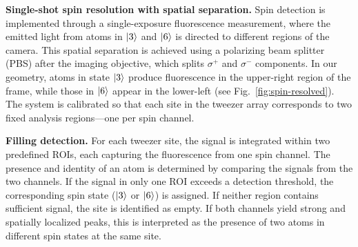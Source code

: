 



\textbf{Single-shot spin resolution with spatial separation.} Spin detection is implemented through a single-exposure fluorescence measurement, where the emitted light from atoms in $\left| 3 \right\rangle$ and $\left| 6 \right\rangle$ is directed to different regions of the camera. This spatial separation is achieved using a polarizing beam splitter (PBS) after the imaging objective, which splits $\sigma^+$ and $\sigma^-$ components. In our geometry, atoms in state $\left| 3 \right\rangle$ produce fluorescence in the upper-right region of the frame, while those in $\left| 6 \right\rangle$ appear in the lower-left (see Fig.~\ref{fig:spin-resolved}). The system is calibrated so that each site in the tweezer array corresponds to two fixed analysis regions—one per spin channel.

\textbf{Filling detection.} For each tweezer site, the signal is integrated within two predefined ROIs, each capturing the fluorescence from one spin channel. The presence and identity of an atom is determined by comparing the signals from the two channels. If the signal in only one ROI exceeds a detection threshold, the corresponding spin state ($\left| 3 \right\rangle$ or $\left| 6 \right\rangle$) is assigned. If neither region contains sufficient signal, the site is identified as empty. If both channels yield strong and spatially localized peaks, this is interpreted as the presence of two atoms in different spin states at the same site.

